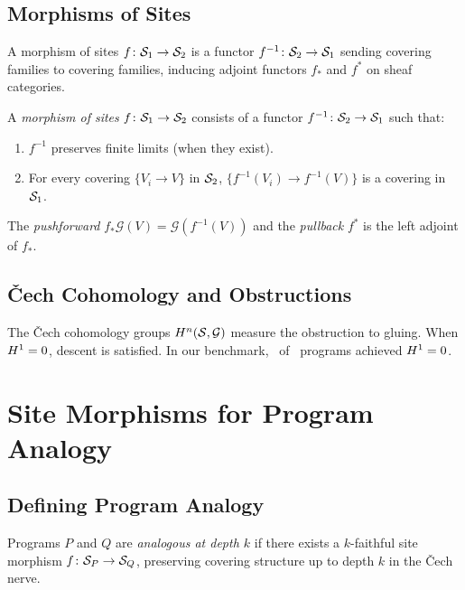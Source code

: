 \documentclass[11pt]{article}
\begin{document}
\subsection{Morphisms of Sites}
A morphism of sites $f \colon \mathcal{S}_1 \to \mathcal{S}_2$ is a functor
$f^{-1} \colon \mathcal{S}_2 \to \mathcal{S}_1$ sending covering families to
covering families, inducing adjoint functors $f_{*}$ and $f^{*}$ on
sheaf categories.

\begin{definition}\label{def:site-morphism}
A \emph{morphism of sites} $f \colon \mathcal{S}_1 \to \mathcal{S}_2$ consists of
a functor $f^{-1} \colon \mathcal{S}_2 \to \mathcal{S}_1$ such that:
\begin{enumerate}[noitemsep]
  \item $f^{-1}$ preserves finite limits (when they exist).
  \item For every covering $\{V_i \to V\}$ in $\mathcal{S}_2$,
        $\{f^{-1}(V_i) \to f^{-1}(V)\}$ is a covering in $\mathcal{S}_1$.
\end{enumerate}
The \emph{pushforward} $f_{*}\mathcal{G}(V) = \mathcal{G}(f^{-1}(V))$
and the \emph{pullback} $f^{*}$ is the left adjoint of $f_{*}$.
\end{definition}

\subsection{\v{C}ech Cohomology and Obstructions}
The \v{C}ech cohomology groups $H^{n}(\mathcal{S}, \mathcal{G})$ measure
the obstruction to gluing.  When $H^{1} = 0$, descent is satisfied.
In our benchmark, \expHOneZero\ of \expTotalPrograms\ programs
achieved $H^{1} = 0$.

\section{Site Morphisms for Program Analogy}\label{sec:site-morphisms}

\subsection{Defining Program Analogy}
Programs $P$ and $Q$ are \emph{analogous at depth $k$} if there exists a
$k$-faithful site morphism $f \colon \mathcal{S}_P \to \mathcal{S}_Q$, preserving
covering structure up to depth $k$ in the \v{C}ech nerve.
\end{document}
